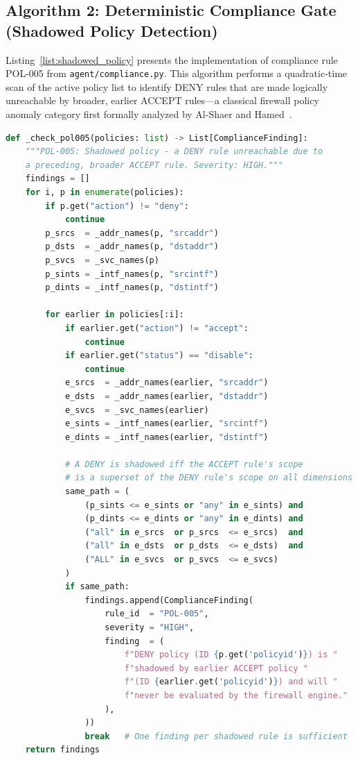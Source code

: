 \subsection{Algorithm 2: Deterministic Compliance Gate (Shadowed Policy Detection)}
\label{subsec:list_compliance}

Listing~\ref{list:shadowed_policy} presents the implementation of compliance rule POL-005 from \texttt{agent/compliance.py}. This algorithm performs a quadratic-time scan of the active policy list to identify DENY rules that are made logically unreachable by broader, earlier ACCEPT rules—a classical firewall policy anomaly category first formally analyzed by Al-Shaer and Hamed~\cite{alshaer2004discovery}.

\begin{lstlisting}[language=Python, caption={Compliance Rule POL-005: Shadowed Policy Detection (\texttt{compliance.py})}, label={list:shadowed_policy}]
def _check_pol005(policies: list) -> List[ComplianceFinding]:
    """POL-005: Shadowed policy - a DENY rule unreachable due to
    a preceding, broader ACCEPT rule. Severity: HIGH."""
    findings = []
    for i, p in enumerate(policies):
        if p.get("action") != "deny":
            continue
        p_srcs  = _addr_names(p, "srcaddr")
        p_dsts  = _addr_names(p, "dstaddr")
        p_svcs  = _svc_names(p)
        p_sints = _intf_names(p, "srcintf")
        p_dints = _intf_names(p, "dstintf")

        for earlier in policies[:i]:
            if earlier.get("action") != "accept":
                continue
            if earlier.get("status") == "disable":
                continue
            e_srcs  = _addr_names(earlier, "srcaddr")
            e_dsts  = _addr_names(earlier, "dstaddr")
            e_svcs  = _svc_names(earlier)
            e_sints = _intf_names(earlier, "srcintf")
            e_dints = _intf_names(earlier, "dstintf")

            # A DENY is shadowed iff the ACCEPT rule's scope
            # is a superset of the DENY rule's scope on all dimensions
            same_path = (
                (p_sints <= e_sints or "any" in e_sints) and
                (p_dints <= e_dints or "any" in e_dints) and
                ("all" in e_srcs  or p_srcs  <= e_srcs)  and
                ("all" in e_dsts  or p_dsts  <= e_dsts)  and
                ("ALL" in e_svcs  or p_svcs  <= e_svcs)
            )
            if same_path:
                findings.append(ComplianceFinding(
                    rule_id  = "POL-005",
                    severity = "HIGH",
                    finding  = (
                        f"DENY policy (ID {p.get('policyid')}) is "
                        f"shadowed by earlier ACCEPT policy "
                        f"(ID {earlier.get('policyid')}) and will "
                        f"never be evaluated by the firewall engine."
                    ),
                ))
                break   # One finding per shadowed rule is sufficient
    return findings
\end{lstlisting}

